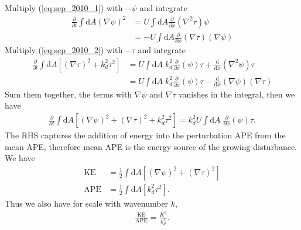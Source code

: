 \documentclass[11pt,letterpaper]{book}
\theoremstyle{definition}
\newcommand{\de}{\mathrm{d}}
\newcommand{\pe}{\partial}
\newcommand{\APE}{\text{APE}}
\newcommand{\KE}{\text{KE}}
\begin{document}
\subsection{}
Multiply (\ref{eq:sep_2010_1}) with $-\psi$ and integrate
\begin{align*}
\frac{\pe}{\pe t}\int\de A\left(\nabla\psi\right)^2 &= U\int\de A \frac{\pe}{\pe x}(\nabla^2\tau)\psi\\
&= -U\int\de A \frac{\pe}{\pe x}(\nabla\tau)(\nabla\psi)
\end{align*}
Multiply (\ref{eq:sep_2010_2}) with $-\tau$ and integrate
\begin{align*}
\frac{\pe}{\pe t}\int\de A\left[(\nabla\tau)^2+k_d^2\tau^2\right] &= U\int\de A\;k_d^2\frac{\pe}{\pe x}(\psi)\tau+\frac{\de}{\de x}(\nabla^2\psi)\tau\\
&= U\int\de A\;k_d^2\frac{\pe}{\pe x}(\psi)\tau-\frac{\de}{\de x}(\nabla\psi)(\nabla\tau)
\end{align*}
Sum them together, the terms with $\nabla\psi$ and $\nabla\tau$ vanishes in the integral, then we have
\begin{align*}
\frac{\pe}{\pe t}\int\de A\left[(\nabla\psi)^2+(\nabla\tau)^2+k_d^2\tau^2\right] = k_d^2U\int\de A\;\frac{\pe}{\pe x}(\psi)\tau.
\end{align*}
The RHS captures the addition of energy into the perturbation APE from the mean APE, therefore mean APE is the energy source of the growing disturbance. We have
\begin{align*}
\KE &= \frac{1}{2}\int\de A\left[(\nabla\psi)^2+(\nabla\tau)^2\right]\\
\APE &= \frac{1}{2}\int\de A\left[k_d^2\tau^2\right].
\end{align*}
Thus we also have for scale with wavenumber $k$, 
\begin{align*}
\frac{\KE}{\APE} = \frac{K^2}{k_d^2}.
\end{align*}
\end{document}

